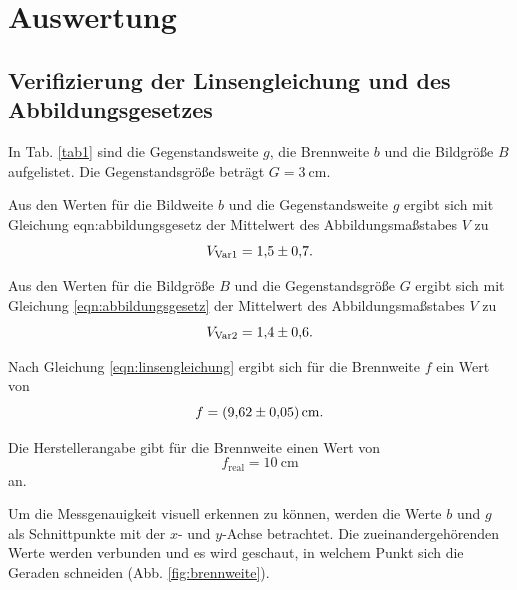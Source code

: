\section{Auswertung}
\label{sec:Auswertung}

\subsection{Verifizierung der Linsengleichung und des Abbildungsgesetzes}
\label{sec:brennweite1}

In Tab. \ref{tab1} sind die Gegenstandsweite $g$, die Brennweite $b$ und die Bildgröße $B$ aufgelistet. Die Gegenstandsgröße beträgt $G = \SI{3}{\centi\meter}$.



\noindent Aus den Werten für die Bildweite $b$ und die Gegenstandsweite $g$ ergibt sich mit Gleichung {eqn:abbildungsgesetz} der Mittelwert des Abbildungsmaßstabes $V$ zu 
\begin{equation*}
    V_\text{Var1} = \num{1.5 \pm 0.7}.
\end{equation*}

\noindent Aus den Werten für die Bildgröße $B$ und die Gegenstandsgröße $G$ ergibt sich mit Gleichung \eqref{eqn:abbildungsgesetz} der Mittelwert des Abbildungsmaßstabes $V$ zu
\begin{equation*}
    V_\text{Var2} = \num{1.4 \pm 0.6}.
\end{equation*}

\noindent Nach Gleichung \eqref{eqn:linsengleichung} ergibt sich für die Brennweite $f$ ein Wert von 
\begin{equation*}
    f = \SI{9.62 \pm 0.05}{\centi\meter}.
\end{equation*}

\noindent Die Herstellerangabe gibt für die Brennweite einen Wert von 
\begin{equation*}
    f_\text{real} = \SI{10}{\centi\meter}
\end{equation*}
an.

\noindent Um die Messgenauigkeit visuell erkennen zu können, werden die Werte $b$ und $g$ als Schnittpunkte mit der $x$- und $y$-Achse betrachtet. Die zueinandergehörenden Werte werden verbunden und es wird geschaut, in welchem Punkt sich die Geraden schneiden (Abb. \ref{fig:brennweite}).

